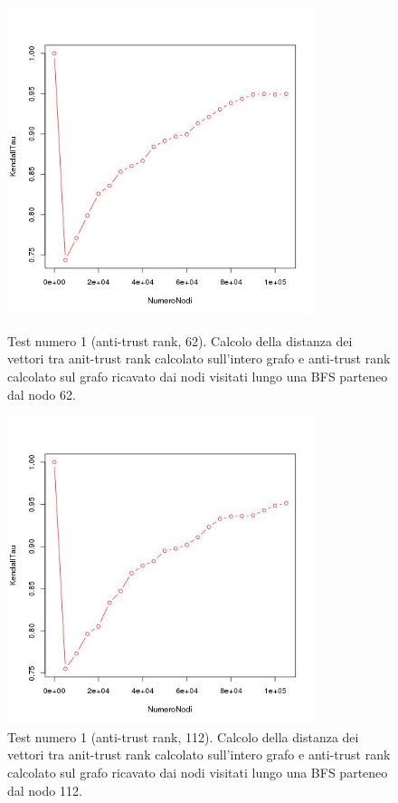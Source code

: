 \begin{figure}
\centering
 \includegraphics[height=9cm]{immagini/test1/antiTrustrankTestMode1_62}
 \caption{Test numero 1 (anti-trust rank, 62). Calcolo della distanza dei vettori tra anit-trust rank calcolato sull'intero grafo e anti-trust rank calcolato sul grafo ricavato dai nodi visitati lungo una BFS parteneo dal nodo 62.}
 \label{fig:test1antitrustModoB62}
\centering
 \includegraphics[height=9cm]{immagini/test1/antiTrustrankTestMode1_112}
 \caption{Test numero 1 (anti-trust rank, 112). Calcolo della distanza dei vettori tra anit-trust rank calcolato sull'intero grafo e anti-trust rank calcolato sul grafo ricavato dai nodi visitati lungo una BFS parteneo dal nodo 112.}
 \label{fig:test1antitrustModoB112}
\end{figure}

